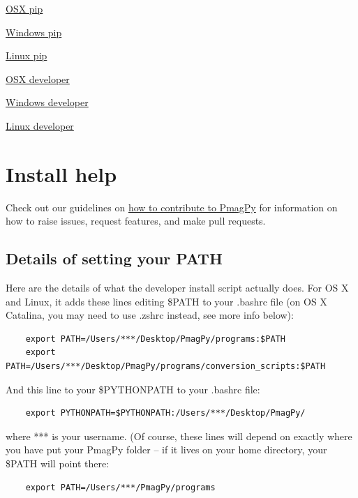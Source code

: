 \documentclass[11pt]{book}
\begin{document}
{\href{https://earthref.org/PmagPy/cookbook/osx_pip.html}{OSX pip}

\href{https://earthref.org/PmagPy/cookbook/windows_pip.html}{Windows pip}

\href{https://earthref.org/PmagPy/cookbook/linux_pip.html}{Linux pip}

\href{https://earthref.org/PmagPy/cookbook/osx_developer.html}{OSX developer}

\href{https://earthref.org/PmagPy/cookbook/windows_developer.html}{Windows developer}

\href{https://earthref.org/PmagPy/cookbook/linux_developer.html}{Linux developer}

\section{Install help}

Check out our guidelines on \href{https://github.com/PmagPy/PmagPy/blob/master/CONTRIBUTING.md}{how to contribute to PmagPy} for information on how to raise issues, request features, and make pull requests.


\subsection{Details of setting your PATH}
Here are the details of what the developer install script actually does.  For OS X and Linux, it adds these lines editing \$PATH to your .bashrc file (on OS X Catalina, you may need to use .zshrc instead, see more info below):

\begin{verbatim}
    export PATH=/Users/***/Desktop/PmagPy/programs:$PATH
    export PATH=/Users/***/Desktop/PmagPy/programs/conversion_scripts:$PATH
\end{verbatim}

And this line to your \$PYTHONPATH to your .bashrc file:

\begin{verbatim}
    export PYTHONPATH=$PYTHONPATH:/Users/***/Desktop/PmagPy/
\end{verbatim}


where *** is your username.  (Of course, these lines will depend on exactly where you have put your PmagPy folder -- if it lives on your home directory, your \$PATH will point there:
\begin{verbatim}
    export PATH=/Users/***/PmagPy/programs
\end{verbatim}

}
\end{document}
